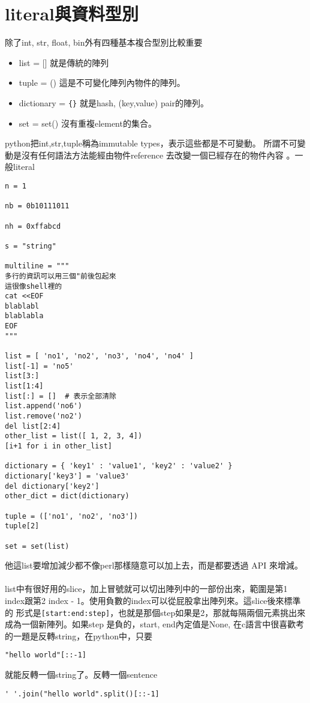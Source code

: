 \section{literal與資料型別}
除了int, str, float, bin外有四種基本複合型別比較重要
\begin{itemize}
\item list = []  就是傳統的陣列
\item tuple = () 這是不可變化陣列內物件的陣列。
\item dictionary = \verb={}= 就是hash, (key,value) pair的陣列。
\item set = set() 沒有重複element的集合。
\end{itemize}
python把int,str,tuple稱為immutable types，表示這些都是不可變動。
所謂不可變動是沒有任何語法方法能經由物件reference 去改變一個已經存在的物件內容
。一般literal
\begin{verbatim}
n = 1

nb = 0b10111011

nh = 0xffabcd

s = "string"

multiline = """
多行的資訊可以用三個"前後包起來
這很像shell裡的
cat <<EOF
blablabl
blablabla
EOF
"""

list = [ 'no1', 'no2', 'no3', 'no4', 'no4' ]
list[-1] = 'no5'
list[3:]
list[1:4]
list[:] = []  # 表示全部清除
list.append('no6')
list.remove('no2')
del list[2:4]
other_list = list([ 1, 2, 3, 4])
[i+1 for i in other_list]

dictionary = { 'key1' : 'value1', 'key2' : 'value2' }
dictionary['key3'] = 'value3'
del dictionary['key2']
other_dict = dict(dictionary)

tuple = (['no1', 'no2', 'no3'])
tuple[2]

set = set(list)
\end{verbatim}
他這list要增加減少都不像perl那樣隨意可以加上去，而是都要透過 API 來增減。
\\\\
list中有很好用的slice，加上冒號就可以切出陣列中的一部份出來，範圍是第1
index跟第2 index - 1。使用負數的index可以從屁股拿出陣列來。這slice後來標準的
形式是\verb=[start:end:step]=，也就是那個step如果是2，那就每隔兩個元素挑出來
成為一個新陣列。如果step 是負的，start, end內定值是None,
在c語言中很喜歡考的一題是反轉string，在python中，只要
\begin{verbatim}
"hello world"[::-1]
\end{verbatim}
就能反轉一個string了。反轉一個sentence
\begin{verbatim}
' '.join("hello world".split()[::-1]
\end{verbatim}
